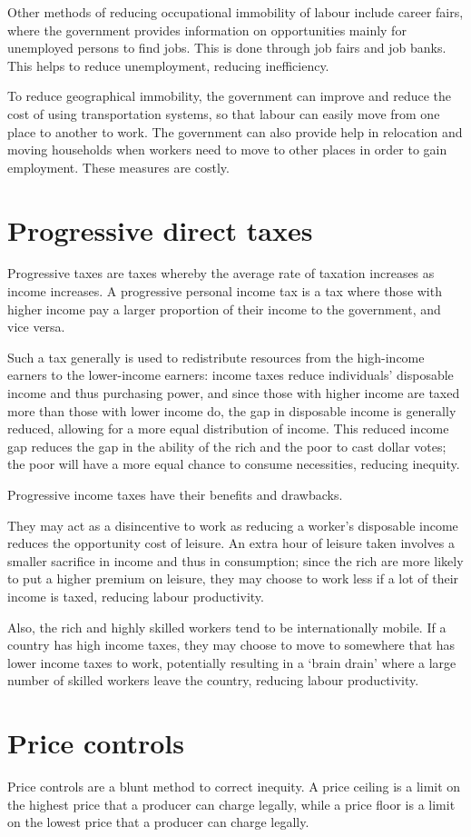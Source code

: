 \documentclass[Economics.tex]{subfiles}
\begin{document}
Other methods of reducing occupational immobility of labour include career fairs, where the government provides information on opportunities mainly for unemployed persons to find jobs. This is done through job fairs and job banks. This helps to reduce unemployment, reducing inefficiency.

To reduce geographical immobility, the government can improve and reduce the cost of using transportation systems, so that labour can easily move from one place to another to work. The government can also provide help in relocation and moving households when workers need to move to other places in order to gain employment. These measures are costly.
\section{Progressive direct taxes}
Progressive taxes are taxes whereby the average rate of taxation increases as income increases. A progressive personal income tax is a tax where those with higher income pay a larger proportion of their income to the government, and vice versa.

Such a tax generally is used to redistribute resources from the high-income earners to the lower-income earners: income taxes reduce individuals' disposable income and thus purchasing power, and since those with higher income are taxed more than those with lower income do, the gap in disposable income is generally reduced, allowing for a more equal distribution of income. This reduced income gap reduces the gap in the ability of the rich and the poor to cast dollar votes; the poor will have a more equal chance to consume necessities, reducing inequity.

Progressive income taxes have their benefits and drawbacks.

They may act as a disincentive to work as reducing a worker's disposable income reduces the opportunity cost of leisure. An extra hour of leisure taken involves a smaller sacrifice in income and thus in consumption; since the rich are more likely to put a higher premium on leisure, they may choose to work less if a lot of their income is taxed, reducing labour productivity.

Also, the rich and highly skilled workers tend to be internationally mobile. If a country has high income taxes, they may choose to move to somewhere that has lower income taxes to work, potentially resulting in a `brain drain' where a large number of skilled workers leave the country, reducing labour productivity.
\section{Price controls}
Price controls are a blunt method to correct inequity. A price ceiling is a limit on the highest price that a producer can charge legally, while a price floor is a limit on the lowest price that a producer can charge legally.
\end{document}
